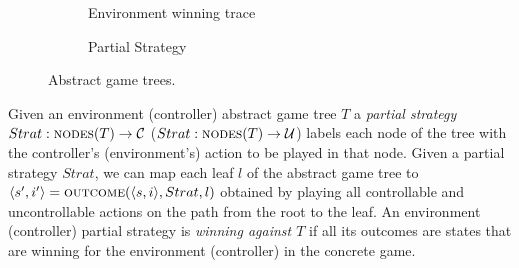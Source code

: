 \begin{figure}
    \begin{subfigure}[t]{.4\textwidth}
        \centering
        \begin{minipage}[t][3.8cm][t]{\textwidth}
        \end{minipage}
        \caption{Environment winning trace}
        \label{fig:trace2}
    \end{subfigure}
    \begin{subfigure}[t]{.4\textwidth}
        \centering
        \begin{minipage}[t][3.8cm][t]{\textwidth}
        \end{minipage}
        \caption{Partial Strategy}
        \label{fig:strategy}
    \end{subfigure}
    \caption{Abstract game trees.}
    \label{fig:alltrees}
\end{figure}


Given an environment (controller) abstract game tree $T$ a \emph{partial
strategy} $Strat: \textsc{nodes}(T) \rightarrow \mathcal{C}$ ($Strat: \textsc{nodes}(T)
\rightarrow \mathcal{U}$) labels each node of the tree with the controller's
(environment's) action to be played in that node.   Given a partial strategy
$Strat$, we can map each leaf $l$ of the abstract game tree to $\langle
s',i'\rangle=\textsc{outcome}(\langle s, i\rangle, Strat, l)$ obtained by
playing all controllable and uncontrollable actions on the path from the root
to the leaf.  An environment (controller) partial strategy is \emph{winning against $T$} 
if all its outcomes are states that are winning for the environment (controller)
in the concrete game.


